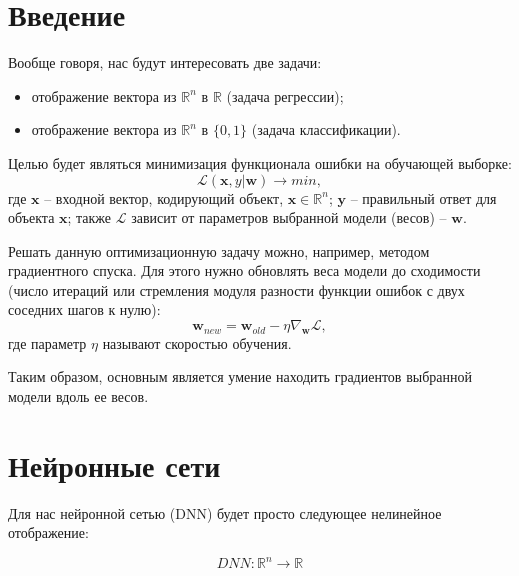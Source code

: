 \documentclass[12pt, oneside, a4paper, openany]{scrarticle}
\begin{document}
\section{Введение}


Вообще говоря, нас будут интересовать две задачи:
\begin{itemize}
	\item отображение вектора из $\mathbb{R}^{n}$ в $\mathbb{R}$ (задача регрессии);
	\item отображение вектора из $\mathbb{R}^{n}$ в $\{0,1\}$ (задача классификации).
\end{itemize}

Целью будет являться минимизация функционала ошибки на обучающей выборке:
\begin{equation}
	\mathscr{L}(\bm{x}, y | \bm{w}) \to min,
\end{equation}
где $\bm{x}$ -- входной вектор, кодирующий объект, $\bm{x} \in \mathbb{R}^n$; $\bm{y}$ -- правильный ответ для объекта $\bm{x}$; также $\mathscr{L}$ зависит от параметров выбранной модели (весов) -- $\bm{w}$.

Решать данную оптимизационную задачу можно, например, методом градиентного спуска. Для этого нужно обновлять веса модели до сходимости (число итераций или стремления модуля разности функции ошибок с двух соседних шагов к нулю):
\begin{equation}
	\bm{w}_{new} = \bm{w}_{old} - \eta \nabla_{\bm{w}} \mathscr{L},
\end{equation}
где параметр $\eta$ называют скоростью обучения.

Таким образом, основным является умение находить градиентов выбранной модели вдоль ее весов.

\section{Нейронные сети}

Для нас нейронной сетью (DNN) будет просто следующее нелинейное отображение:

\begin{equation}
DNN : \mathbb{R}^n \to \mathbb{R}
\end{equation}
\end{document}
